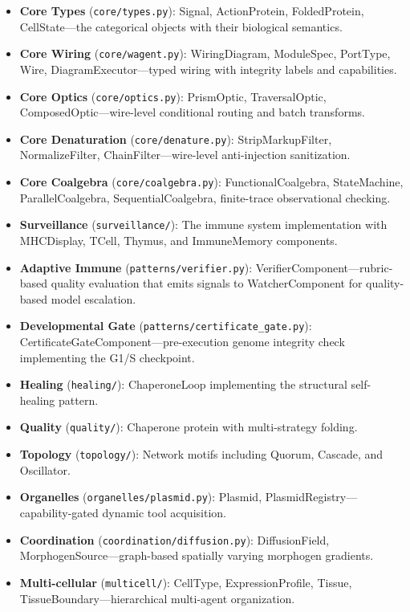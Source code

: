 \begin{itemize}[leftmargin=*]
\item \textbf{Core Types} (\texttt{core/types.py}): Signal, ActionProtein, FoldedProtein, CellState---the
categorical objects with their biological semantics.
\item \textbf{Core Wiring} (\texttt{core/wagent.py}): WiringDiagram, ModuleSpec, PortType, Wire,
DiagramExecutor\allowbreak---typed wiring with integrity labels and capabilities.
\item \textbf{Core Optics} (\texttt{core/optics.py}): PrismOptic, TraversalOptic,
ComposedOptic\allowbreak---wire-level conditional routing and batch transforms.
\item \textbf{Core Denaturation} (\texttt{core/denature.py}): StripMarkupFilter, NormalizeFilter,
ChainFilter---wire-level anti-injection sanitization.
\item \textbf{Core Coalgebra} (\texttt{core/coalgebra.py}): FunctionalCoalgebra, StateMachine,
ParallelCoalgebra, SequentialCoalgebra, finite-trace observational checking.
\item \textbf{Surveillance} (\texttt{surveillance/}): The immune system implementation with MHCDisplay,
TCell, Thymus, and ImmuneMemory components.
\item \textbf{Adaptive Immune} (\texttt{patterns/verifier.py}): VerifierComponent---rubric-based
quality evaluation that emits signals to WatcherComponent for quality-based model escalation.
\item \textbf{Developmental Gate} (\texttt{patterns/certificate\_gate.py}):
CertificateGateComponent---pre-execution genome integrity check implementing the G1/S checkpoint.
\item \textbf{Healing} (\texttt{healing/}): ChaperoneLoop implementing the structural self-healing pattern.
\item \textbf{Quality} (\texttt{quality/}): Chaperone protein with multi-strategy folding.
\item \textbf{Topology} (\texttt{topology/}): Network motifs including Quorum, Cascade, and Oscillator.
\item \textbf{Organelles} (\texttt{organelles/plasmid.py}): Plasmid,
PlasmidRegistry---capability-gated dynamic tool acquisition.
\item \textbf{Coordination} (\texttt{coordination/diffusion.py}): DiffusionField,
MorphogenSource---graph-based spatially varying morphogen gradients.
\item \textbf{Multi-cellular} (\texttt{multicell/}): CellType, ExpressionProfile, Tissue,
TissueBoundary---hierarchical multi-agent organization.
\end{itemize}

